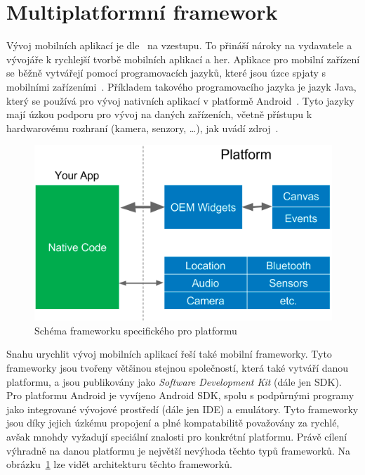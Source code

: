 \section{Multiplatformní framework}

Vývoj mobilních aplikací je dle~\cite{wepc_video_game_statistics} na vzestupu.
To přináší nároky na vydavatele a vývojáře k rychlejší tvorbě mobilních
aplikací a her.
Aplikace pro mobilní zařízení se běžně vytvářejí pomocí programovacích jazyků,
které jsou úzce spjaty
s mobilními zařízeními~\cite{dashmagazine_mobile_frameworks}.
Příkladem takového programovacího jazyka je jazyk Java,
který se používá pro vývoj nativních aplikací
v platformě Android~\cite{dashmagazine_mobile_frameworks}.
Tyto jazyky mají úzkou podporu pro vývoj na daných zařízeních,
včetně přístupu k hardwarovému rozhraní (kamera, senzory, \dots{}),
jak uvádí zdroj~\cite{dashmagazine_mobile_frameworks}. 

\begin{figure}[ht!]
    \centering
    \includegraphics[width=\linewidth]{assets/technology-research/framework/platform_sdk.png}
    \caption{Schéma frameworku specifického pro platformu ~\cite{hackernoon_flutter}}
    \label{fig:framework_platform}
\end{figure}

Snahu urychlit vývoj mobilních aplikací řeší také mobilní frameworky.
Tyto frameworky jsou tvořeny většinou stejnou společností,
která také vytváří danou platformu,
a jsou publikovány jako \emph{Software Development Kit} (dále jen SDK).
Pro platformu Android je vyvíjeno Android SDK,
spolu s podpůrnými programy jako integrované vývojové prostředí
(dále jen IDE) a emulátory.
Tyto frameworky jsou díky jejich úzkému propojení a plné kompatabilitě
považovány za rychlé,
avšak mnohdy vyžadují speciální znalosti pro konkrétní platformu.
Právě cílení výhradně na danou platformu je největší nevýhoda těchto typů
frameworků.
Na obrázku~\ref{fig:framework_platform} lze vidět architekturu těchto
frameworků.~\cite{dashmagazine_mobile_frameworks}

